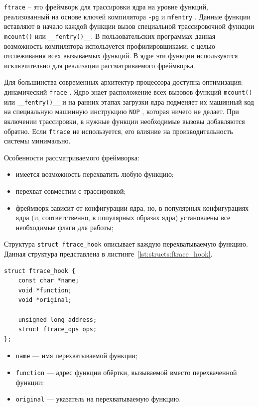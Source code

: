 \texttt{ftrace} \cite{ftrace} -- это фреймворк для трассировки ядра на уровне функций, реализованный на основе ключей компилятора \texttt{-pg} \cite{ftrace-habr} и \texttt{mfentry} \cite{ftrace-habr}. Данные функции вставляют в начало каждой функции вызов специальной трассировочной функции \texttt{mcount()} или \texttt{\_\_fentry()\_\_}. В пользовательских программах данная возможность компилятора используется профилировщиками, с целью отслеживания всех вызываемых функций. В ядре эти функции используются исключительно для реализации рассматриваемого фреймворка.

Для большинства современных архитектур процессора доступна оптимизация: динамический \texttt{frace} \cite{ftrace-habr}. Ядро знает расположение всех вызовов функций \texttt{mcount()} или \texttt{\_\_fentry()\_\_} и на ранних этапах загрузки ядра подменяет их машинный код на специальную машинную инструкцию \texttt{NOP} \cite{NOP}, которая ничего не делает. При включении трассировки, в нужные функции необходимые вызовы добавляются обратно. Если \texttt{ftrace} не используется, его влияние на производительность системы минимально.

Особенности рассматриваемого фреймворка:

\begin{itemize}
	\item имеется возможность перехватить любую функцию;
	\item перехват совместим с трассировкой;
	\item фреймворк зависит от конфигурации ядра, но, в популярных конфигурациях ядра (и, соответственно, в популярных образах ядра) установлены все необходимые флаги для работы; 
\end{itemize}

Структура \texttt{struct ftrace\_hook} описывает каждую перехватываемую функцию. Данная структура представлена в листинге~\ref{lst:structs:ftrace_hook}. 

\begin{lstlisting}[label=lst:structs:ftrace_hook,caption=struct ftrace\_hook]	
struct ftrace_hook {
	const char *name;
	void *function;
	void *original;
	
	unsigned long address;
	struct ftrace_ops ops;
};
\end{lstlisting}

\begin{itemize}
	\item \texttt{name} --- имя перехватываемой функции;
	\item \texttt{function} --- адрес функции обёртки, вызываемой вместо перехваченной функции;
	\item \texttt{original} --- указатель на перехватываемую функцию.
\end{itemize}

